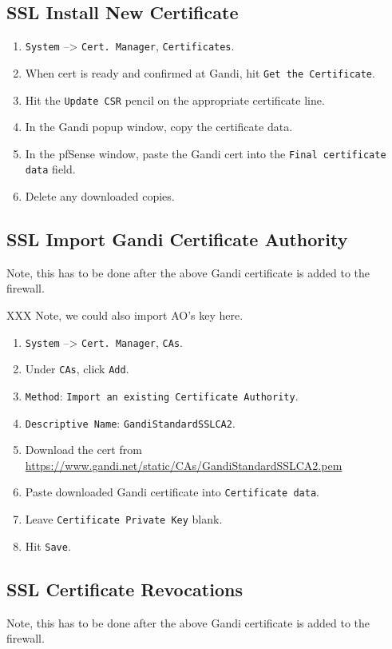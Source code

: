 \subsection{SSL Install New Certificate}
\begin{enumerate}
 \item \texttt{System} --> \texttt{Cert. Manager}, \texttt{Certificates}.
 \item When cert is ready and confirmed at Gandi, hit \texttt{Get the Certificate}.
 \item Hit the \texttt{Update CSR} pencil on the appropriate certificate line.
 \item In the Gandi popup window, copy the certificate data.
 \item In the pfSense window, paste the Gandi cert into the \texttt{Final certificate data} field.
 \item Delete any downloaded copies.
\end{enumerate}

\subsection{SSL Import Gandi Certificate Authority}
Note, this has to be done after the above Gandi certificate is added to the firewall.

XXX Note, we could also import AO's key here.

\begin{enumerate}
 \item \texttt{System} --> \texttt{Cert. Manager}, \texttt{CAs}.
 \item Under \texttt{CAs}, click \texttt{Add}.
 \item \texttt{Method}: \texttt{Import an existing Certificate Authority}.
 \item \texttt{Descriptive Name}: \texttt{GandiStandardSSLCA2}.
 \item Download the cert from \url{https://www.gandi.net/static/CAs/GandiStandardSSLCA2.pem}
 \item Paste downloaded Gandi certificate into \texttt{Certificate data}.
 \item Leave \texttt{Certificate Private Key} blank.
 \item Hit \texttt{Save}.
\end{enumerate}

\subsection{SSL Certificate Revocations}
Note, this has to be done after the above Gandi certificate is added to the firewall.

